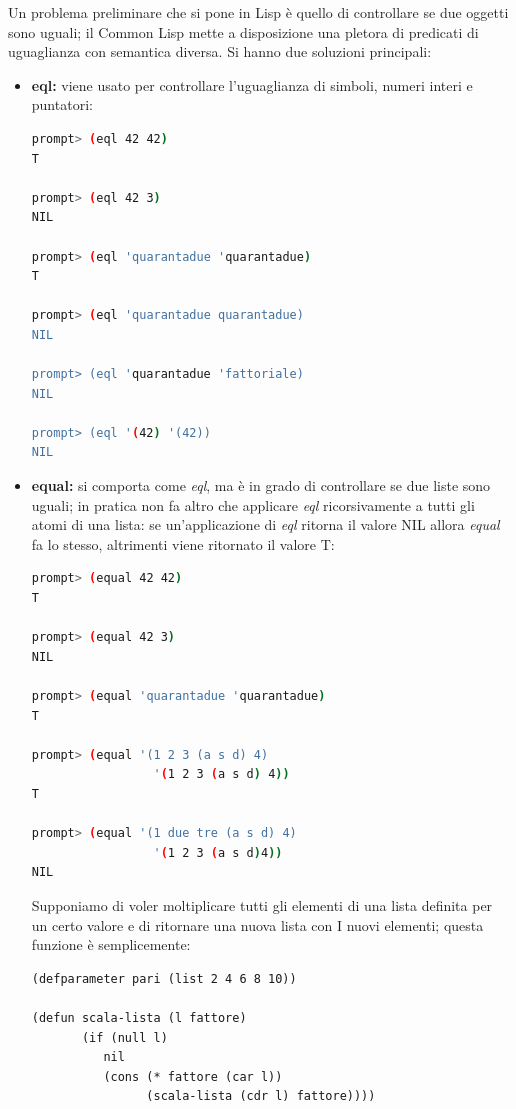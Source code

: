 \documentclass[a4paper,12pt, oneside]{book}
\begin{document}
Un problema preliminare che si pone in Lisp è quello di
controllare se due oggetti sono uguali; il Common Lisp mette a disposizione una pletora di predicati di uguaglianza con
semantica diversa. Si hanno due soluzioni principali:
\begin{itemize}
	\item \textbf{eql:} viene usato per controllare l'uguaglianza di simboli, numeri interi e puntatori:
	      \begin{shaded}
		      \begin{lstlisting}[language=bash]
prompt> (eql 42 42)
T

prompt> (eql 42 3)
NIL

prompt> (eql 'quarantadue 'quarantadue)
T

prompt> (eql 'quarantadue quarantadue)
NIL

prompt> (eql 'quarantadue 'fattoriale)
NIL

prompt> (eql '(42) '(42))
NIL
\end{lstlisting}
	      \end{shaded}
	\item \textbf{equal:} si comporta come \textit{eql}, ma è in grado di controllare se due liste sono uguali; in pratica non fa altro che applicare \textit{eql} ricorsivamente a tutti
	      gli atomi di una lista: se un'applicazione di \textit{eql} ritorna il valore NIL allora \textit{equal} fa lo stesso, altrimenti viene ritornato il valore T:
	      \begin{shaded}
		      \begin{lstlisting}[language=bash]
prompt> (equal 42 42)
T

prompt> (equal 42 3)
NIL

prompt> (equal 'quarantadue 'quarantadue)
T

prompt> (equal '(1 2 3 (a s d) 4) 
                 '(1 2 3 (a s d) 4))
T

prompt> (equal '(1 due tre (a s d) 4) 
                 '(1 2 3 (a s d)4))
NIL
\end{lstlisting}
	      \end{shaded}
	      Supponiamo di voler moltiplicare tutti gli elementi di una lista definita per un certo valore e di ritornare una nuova lista con I nuovi elementi; questa
	      funzione è semplicemente:
	      \begin{verbatim}
(defparameter pari (list 2 4 6 8 10))

(defun scala-lista (l fattore)
       (if (null l)
          nil
          (cons (* fattore (car l))
                (scala-lista (cdr l) fattore))))
\end{verbatim}
\end{itemize}
\end{document}
